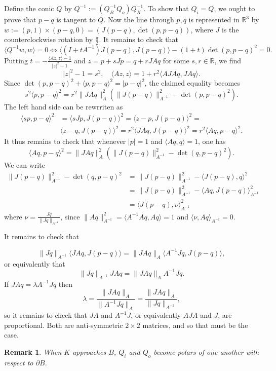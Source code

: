 \documentclass[reqno,10pt]{amsart}
\newtheorem{Remark}[Proposition]{Remark}
\newcommand{\R}{\mathbb{R}}
\begin{document}
Define the conic $Q$ by $Q^{-1}:=(Q_B^{-1}Q_o)Q_K^{-1}$. To show that $Q_i=Q$, we ought to prove that $p-q$ is tangent to $Q$. Now the line through $p,q$ is represented in $\R^3$ by $w:=(p,1)\times (p-q,0)=(J(p-q), \det(p,p-q))$, where $J$ is the counterclockwise rotation by $\frac\pi 2$. It remains to check that $$\langle Q^{-1}w, w\rangle=0\iff \langle (I+tA^{-1})J(p-q), J(p-q)\rangle -(1+t)\det(p,p-q)^2=0.$$
Putting $t=-\frac{\langle Az, z\rangle-1}{|z|^2-1}$ and $ z=p+sJp=q+rJAq$ for some $s, r\in \R$, we find
$$ |z|^2-1=s^2,\quad \langle Az,z\rangle =1+r^2\langle AJAq, JAq\rangle.$$
Since $\det(p,p-q)^2+\langle p,p-q\rangle ^2=|p-q|^2$, the claimed equality becomes 
$$ s^2\langle p,p-q\rangle^2=r^2\|JAq\|_A^2(\|J(p-q)\|_{A^{-1}}^2-\det(p,p-q)^2).$$
The left hand side can be rewrriten as
\begin{align*}\langle sp, p-q\rangle^2&=\langle sJp, J(p-q)\rangle^2=\langle z-p, J(p-q)\rangle^2=\\&\langle z-q, J(p-q)\rangle^2=r^2\langle JAq, J(p-q)\rangle^2=r^2\langle Aq, p-q\rangle^2.\end{align*}
It thus remains to check that whenever $|p|=1$ and $\langle Aq,q\rangle=1$, one has
$$ \langle Aq, p-q\rangle^2=\|JAq\|_A^2(\|J(p-q)\|_{A^{-1}}^2-\det(q,p-q)^2).$$
We can write 
\begin{align*}\|J(p-q)\|_{A^{-1}}^2-\det(q,p-q)^2&=\|J(p-q)\|_{A^{-1}}^2-\langle J(p-q), q\rangle^2\\&=\|J(p-q)\|_{A^{-1}}^2-\langle Aq, J(p-q)\rangle_{A^{-1}}^2\\&=\langle J(p-q), \nu \rangle_{A^{-1}}^2\end{align*}
where $\nu=\frac{Jq}{\|Jq\|_{A^{-1}}}$, since $\|Aq\|_{A^{-1}}^2=\langle A^{-1}Aq, Aq\rangle=1$ and $\langle \nu, Aq\rangle_{A^{-1}}=0$.

It remains to check that 

$$ \|Jq\|_{A^{-1}}\langle JAq, J(p-q)\rangle=\|JAq\|_A\langle A^{-1}Jq, J(p-q)\rangle,$$
or equivalently that $$\|Jq\|_{A^{-1}}JAq=\|JAq\|_A A^{-1}Jq.$$
If $JAq=\lambda A^{-1}Jq$ then $$\lambda =\frac{\|JAq\|_A}{\|A^{-1}Jq\|_A}=\frac{\|JAq\|_A}{\|Jq\|_{A^{-1}}},$$
so it remains to check that $JA$ and $A^{-1}J$, or equivalently $AJA$ and $J$, are proportional. 
Both are anti-symmetric $2\times 2$ matrices, and so that must be the case. 


\endproof
\begin{Remark}
	When $K$ approaches $B$, $Q_i$ and $Q_o$ become polars of one another with respect to $\partial B$.
\end{Remark}
\end{document}
